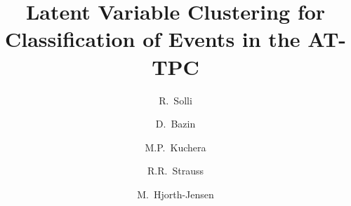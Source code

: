 \documentclass[review,number,sort&compress]{elsarticle}
\begin{document}
\begin{frontmatter}


\title{Latent Variable Clustering for Classification of Events in the AT-TPC}


\author{R.~Solli}
\address{Expert Analytics AS, Tordenskiolds gate 6, 0160, Oslo, Norway}
\address{Department of Physics, University of Oslo, POB 1048 Oslo, N-0316 Oslo, Norway}

\author{D.~Bazin}
\address{Department of Physics and Astronomy and Facility for Rare Ion Beams and National Superconducting Cyclotron Facility, Michigan State University, East Lansing, MI 48824, USA}
\author{M.P.~Kuchera}
\address{Department of Physics, Davidson College, Davidson, North Carolina, USA}
\author{R.R.~Strauss}
\address{Department of Mathematics and Computer Science, Davidson College, Davidson, North Carolina, USA}

\author{M.~Hjorth-Jensen}
\address{Department of Physics and Astronomy and Facility for Rare Ion Beams and National Superconducting Cyclotron Facility, Michigan State University, East Lansing, MI 48824, USA}
\address{Department of Physics and Center for Computing in Science Education, University of Oslo, POB 1048 Oslo, N-0316 Oslo, Norway}



\end{frontmatter}
\end{document}
